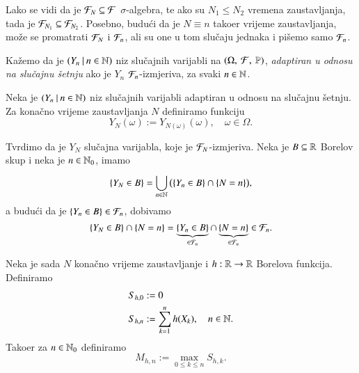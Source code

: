 Lako se vidi da je $\mathcal{F}_N \subseteq \mathcal{F}$ $\sigma$-algebra, te ako su $N_1 \leq N_2$ vremena zaustavljanja, tada je $\mathcal{F}_{N_1} \subseteq \mathcal{F}_{N_2}$.
Posebno, budu\' ci da je $N \equiv n$ tako\dj er vrijeme zaustavljanja, mo\v ze se promatrati $\mathcal{F}_N$ i $\mathcal{F}_n$, ali su one u tom slu\v caju jednaka i pi\v semo samo $\mathcal{F}_n$.

\begin{defn}    \label{defn:15.5-1}
    Ka\v zemo da je $({Y_n} \: | \: {n \in \mathbb{N}})$ niz slu\v cajnih varijabli na $(\Omega, \: \mathcal{F}, \: \mathbb{P})$, \emph{adaptiran u odnosu na slu\v cajnu \v setnju} ako je $Y_n$ $\mathcal{F}_n$-izmjeriva, za svaki $n \in \mathbb{N}$.
\end{defn}

\begin{defn}    \label{defn:15.5-2}
    Neka je $({Y_n} \: | \: {n \in \mathbb{N}})$ niz slu\v cajnih varijabli adaptiran u odnosu na slu\v cajnu \v setnju. Za kona\v cno vrijeme zaustavljanja $N$ definiramo funkciju
    \begin{equation}    \label{jed:15.6}
        Y_N (\omega) := Y_{N (\omega)} (\omega), \quad \omega \in \Omega.
    \end{equation}
\end{defn}

Tvrdimo da je $Y_N$ slu\v cajna varijabla, koje je $\mathcal{F}_N$-izmjeriva.
Neka je $B \subseteq \mathbb{R}$ Borelov skup i neka je $n \in \mathbb{N}_0$, imamo
\begin{equation*}
    \{ Y_N \in B \} = \bigcup\limits_{n \in \mathbb{N}}^{} \big( \{ Y_n \in B \} \cap \{ N = n \} \big),
\end{equation*}
a budu\' ci da je $\{ Y_n \in B \} \in \mathcal{F}_n$, dobivamo
\begin{equation*}
    \{ Y_N \in B \} \cap \{ N = n \} = \underbrace{\{Y_n \in B\}}_{\in \mathcal{F}_n} \cap \underbrace{\{N = n\}}_{\in \mathcal{F}_n} \in \mathcal{F}_n.
\end{equation*}

\begin{defn}    \label{defn:15.5-3}
    Neka je sada $N$ kona\v cno vrijeme zaustavljanje i $h: \mathbb{R} \to \mathbb{R}$ Borelova funkcija.
    Definiramo
    \begin{equation*}
        \begin{aligned}
            S_{h, 0} &:= 0\\
            S_{h, n} &:= \sum\limits_{k = 1}^{n} h(X_k), \quad n \in \mathbb{N}.
        \end{aligned}
    \end{equation*}
    Tako\dj er za $n \in \mathbb{N}_0$ definiramo
    \begin{equation*}
        M_{h, n} := \max\limits_{0 \leq k \leq n} S_{h, k}.
    \end{equation*}
\end{defn}

